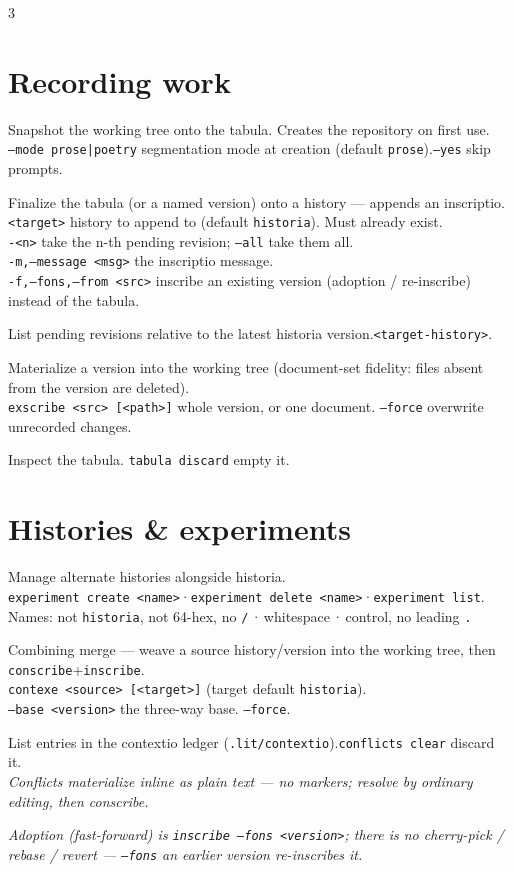 \documentclass[9pt]{extarticle}
\newcommand{\ci}[1]{\texttt{#1}}                       %
\newcommand{\opt}[1]{\textcolor{faint}{\texttt{#1}}}   %
\newcommand{\entry}[2]{\needspace{2\baselineskip}\item[\ci{\textbf{#1}}]#2}
\begin{document}
\begin{multicols}{3}
\section{Recording work}
\begin{description}
\entry{conscribe}{Snapshot the working tree onto the tabula.
Creates the repository on first use.\\
\opt{--mode prose|poetry}\; segmentation mode at creation
(default \ci{prose}).\quad\opt{--yes}\; skip prompts.}
\entry{inscribe}{Finalize the tabula (or a named version) onto
a history — appends an inscriptio.\\
\opt{<target>}\; history to append to (default \ci{historia}).
Must already exist.\\
\opt{-<n>}\; take the n-th pending revision;\;
\opt{--all}\; take them all.\\
\opt{-m,\;--message <msg>}\; the inscriptio message.\\
\opt{-f,\;--fons,\;--from <src>}\; inscribe an existing version
(adoption / re-inscribe) instead of the tabula.}
\entry{status}{List pending revisions relative to the latest
historia version.\quad\opt{<target-history>}.}
\entry{exscribe}{Materialize a version into the working tree
(document-set fidelity: files absent from the version are
deleted).\\
\ci{exscribe <src> [<path>]}\; whole version, or one document.\quad
\opt{--force}\; overwrite unrecorded changes.}
\entry{tabula}{Inspect the tabula.\quad
\ci{tabula discard}\; empty it.}
\end{description}

\section{Histories \& experiments}
\begin{description}
\entry{experiment}{Manage alternate histories alongside
historia.\\
\ci{experiment create <name>}\;·\;\ci{experiment delete <name>}\;·\;\ci{experiment list}.\\
Names: not \ci{historia}, not 64-hex, no \ci{/}\,·\,whitespace\,·\,control, no leading \ci{.}}
\entry{contexe}{Combining merge — weave a source history/version
into the working tree, then \ci{conscribe}+\ci{inscribe}.\\
\ci{contexe <source> [<target>]}\; (target default \ci{historia}).\\
\opt{--base <version>}\; the three-way base.\quad
\opt{--force}.}
\entry{conflicts}{List entries in the contextio ledger
(\ci{.lit/contextio}).\quad\ci{conflicts clear}\; discard it.\\
\emph{Conflicts materialize inline as plain text — no markers;
resolve by ordinary editing, then conscribe.}}
\end{description}
\emph{Adoption (fast-forward) is \ci{inscribe --fons <version>};
there is no cherry-pick / rebase / revert — \ci{--fons} an
earlier version re-inscribes it.}


\end{multicols}
\end{document}
